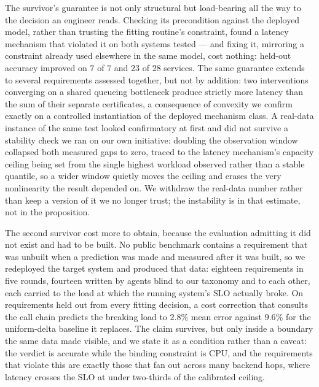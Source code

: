 \documentclass[journal, 10pt]{IEEEtran}
\begin{document}
The survivor's guarantee is not only structural but load-bearing all the way to
the decision an engineer reads. Checking its precondition against the deployed
model, rather than trusting the fitting routine's constraint, found a latency
mechanism that violated it on both systems tested --- and fixing it, mirroring
a constraint already used elsewhere in the same model, cost nothing: held-out
accuracy improved on $7$ of $7$ and $23$ of $28$ services. The same guarantee
extends to several requirements assessed together, but not by addition: two
interventions converging on a shared queueing bottleneck produce strictly more
latency than the sum of their separate certificates, a consequence of convexity
we confirm exactly on a controlled instantiation of the deployed mechanism
class. A real-data instance of the same test looked confirmatory at first and
did not survive a stability check we ran on our own initiative: doubling the
observation window collapsed both measured gaps to zero, traced to the latency
mechanism's capacity ceiling being set from the single highest workload
observed rather than a stable quantile, so a wider window quietly moves the
ceiling and erases the very nonlinearity the result depended on. We withdraw
the real-data number rather than keep a version of it we no longer trust; the
instability is in that estimate, not in the proposition.

The second survivor cost more to obtain, because the evaluation admitting it did
not exist and had to be built. No public benchmark contains a requirement that
was unbuilt when a prediction was made and measured after it was built, so we
redeployed the target system and produced that data: eighteen requirements in
five rounds, fourteen written by agents blind to our taxonomy and to each other,
each carried to the load at which the running system's SLO actually broke. On requirements held out
from every fitting decision, a cost correction that consults the call chain
predicts the breaking load to $2.8\%$ mean error against $9.6\%$ for the
uniform-delta baseline it replaces. The claim survives, but only inside a
boundary the same data made visible, and we state it as a condition rather than
a caveat: the verdict is accurate while the binding constraint is CPU, and the
requirements that violate this are exactly those that fan out across many
backend hops, where latency crosses the SLO at under two-thirds of the
calibrated ceiling.
\end{document}
